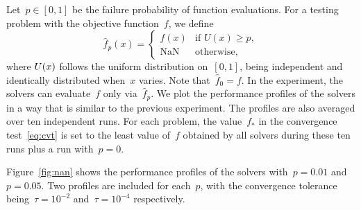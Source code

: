 \documentclass[
    smallextended,  %
    draft,          %
    final,          %
]{svjour3}
\newcommand{\iter}[1][k]{x\ifthenelse{\equal{#1}{}}{}{_{#1}}}
\newcommand{\obj}{f}
\begin{document}
Let~$p \in [0,1]$ be the failure probability of function evaluations.
For a testing problem with the objective function~$\obj$, we define
\begin{equation}
    \label{eq:nan-obj}
    \hat{\obj}_p(x) = \begin{cases}
        \obj(x) & \text{if~$U(x) \ge p$}, \\[0.5ex]
        \text{NaN} & \text{otherwise},
    \end{cases}
\end{equation}
where $U(\iter[])$ follows the uniform distribution on~$[0,1]$, being independent and identically distributed when~$x$ varies.
Note that~$\hat{\obj}_0 = f$.
In the experiment, the solvers can evaluate~$\obj$ only via~$\hat{\obj}_p$.
We plot the performance profiles of the solvers in a way that is similar to the previous experiment.
The profiles are also averaged over ten independent runs.
For each problem, the
value~$\obj_{\ast}$ in the convergence test~\eqref{eq:cvt} is set to the least value of~$\obj$ obtained
by all solvers during these ten runs plus a run with~$p = 0$.

Figure~\ref{fig:nan} shows the performance profiles of the solvers with~$p = 0.01$ and~$p=0.05$.
Two profiles are included for each~$p$, with the convergence tolerance being~$\tau = 10^{-2}$ and~$\tau = 10^{-4}$ respectively.
\end{document}
